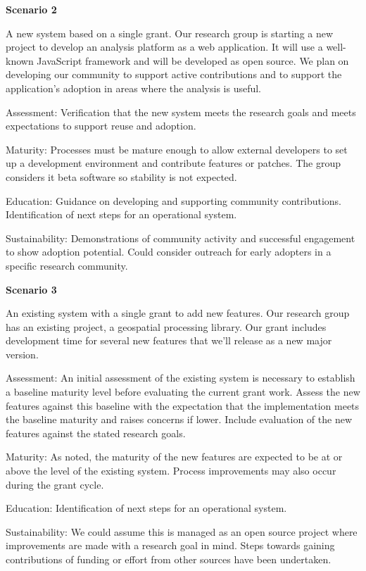 \documentclass{article}
\begin{document}
\textbf{Scenario 2} 
\begin{adjustwidth}{1cm}{0cm}
A new system based on a single grant.
Our research group is starting a new project to develop an analysis platform as a web application. It will use a well-known JavaScript framework and will be developed as open source. We plan on developing our community to support active contributions and to support the application’s adoption in areas where the analysis is useful. 
 
Assessment: Verification that the new system meets the research goals and meets expectations to support reuse and adoption. 
 
Maturity: Processes must be mature enough to allow external developers to set up a development environment and contribute features or patches. The group considers it beta software so stability is not expected.
 
Education: Guidance on developing and supporting community contributions. Identification of next steps for an operational system.
 
Sustainability: Demonstrations of community activity and successful engagement to show adoption potential. Could consider outreach for early adopters in a specific research community.
\end{adjustwidth}

\textbf{Scenario 3} 
\begin{adjustwidth}{1cm}{0cm}
An existing system with a single grant to add new features.
Our research group has an existing project, a geospatial processing library. Our grant includes development time for several new features that we’ll release as a new major version.
 
Assessment: An initial assessment of the existing system is necessary to establish a baseline maturity level before evaluating the current grant work. Assess the new features against this baseline with the expectation that the implementation meets the baseline maturity and raises concerns if lower. Include evaluation of the new features against the stated research goals. 
 
Maturity: As noted, the maturity of the new features are expected to be at or above the level of the existing system. Process improvements may also occur during the grant cycle.
 
Education: Identification of next steps for an operational system.
 
Sustainability: We could assume this is managed as an open source project where improvements are made with a research goal in mind. Steps towards gaining contributions of funding or effort from other sources have been undertaken.
\end{adjustwidth}
\end{document}
